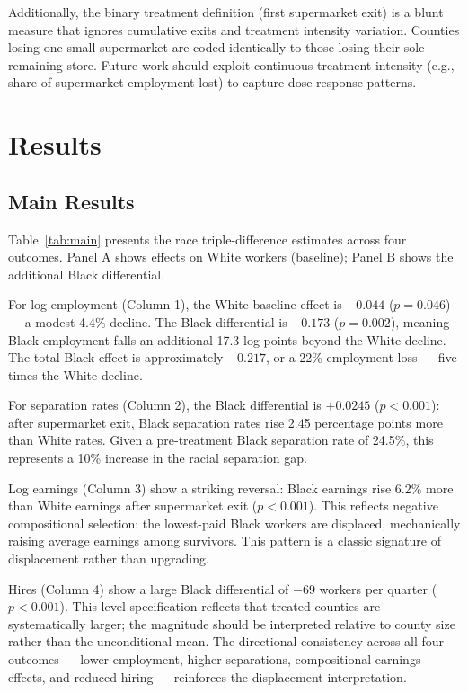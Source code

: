 \documentclass[12pt]{article}
\begin{document}
Additionally, the binary treatment definition (first supermarket exit) is a blunt measure that ignores cumulative exits and treatment intensity variation. Counties losing one small supermarket are coded identically to those losing their sole remaining store. Future work should exploit continuous treatment intensity (e.g., share of supermarket employment lost) to capture dose-response patterns.

\section{Results}

\subsection{Main Results}



Table~\ref{tab:main} presents the race triple-difference estimates across four outcomes. Panel A shows effects on White workers (baseline); Panel B shows the additional Black differential.

For log employment (Column 1), the White baseline effect is $-0.044$ ($p = 0.046$) --- a modest 4.4\% decline. The Black differential is $-0.173$ ($p = 0.002$), meaning Black employment falls an additional 17.3 log points beyond the White decline. The total Black effect is approximately $-0.217$, or a 22\% employment loss --- five times the White decline.

For separation rates (Column 2), the Black differential is $+0.0245$ ($p < 0.001$): after supermarket exit, Black separation rates rise 2.45 percentage points more than White rates. Given a pre-treatment Black separation rate of 24.5\%, this represents a 10\% increase in the racial separation gap.

Log earnings (Column 3) show a striking reversal: Black earnings rise 6.2\% more than White earnings after supermarket exit ($p < 0.001$). This reflects negative compositional selection: the lowest-paid Black workers are displaced, mechanically raising average earnings among survivors. This pattern is a classic signature of displacement rather than upgrading.

Hires (Column 4) show a large Black differential of $-69$ workers per quarter ($p < 0.001$). This level specification reflects that treated counties are systematically larger; the magnitude should be interpreted relative to county size rather than the unconditional mean. The directional consistency across all four outcomes --- lower employment, higher separations, compositional earnings effects, and reduced hiring --- reinforces the displacement interpretation.
\end{document}
